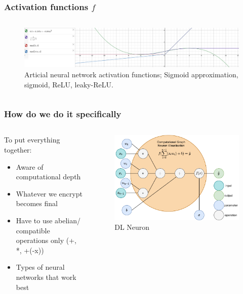 \documentclass[aspectratio=169]{beamer}
\begin{document}
  \begin{frame}
    \frametitle{Activation functions $f$}
    \begin{columns}
      \begin{column}{1\textwidth}
        \begin{figure}[th!]
          \centering
          \includegraphics[width=1\textwidth]{activations.png}
          \caption{Articial neural network activation functions; Sigmoid approximation, sigmoid, ReLU, leaky-ReLU. \autocite{repository}}
          \label{fig:approximation}
        \end{figure}
      \end{column}
    \end{columns}
  \end{frame}

  \begin{frame}
    \frametitle{How do we do it specifically}
    \begin{columns}
      \begin{column}{0.5\textwidth}
        To put everything together:
        \begin{itemize}
          \item Aware of computational depth
          \item Whatever we encrypt becomes final
          \item Have to use abelian/ compatible operations only (+, *, +(-x))
          \item Types of neural networks that work best
        \end{itemize}
      \end{column}
      \begin{column}{0.5\textwidth}
        \begin{figure}[th!]
          \centering
          \includegraphics[width=1\textwidth]{neuron_computational_graph.pdf}
          \caption{DL Neuron \autocite{openmined}}
        \end{figure}
      \end{column}
    \end{columns}
  \end{frame}
\end{document}
